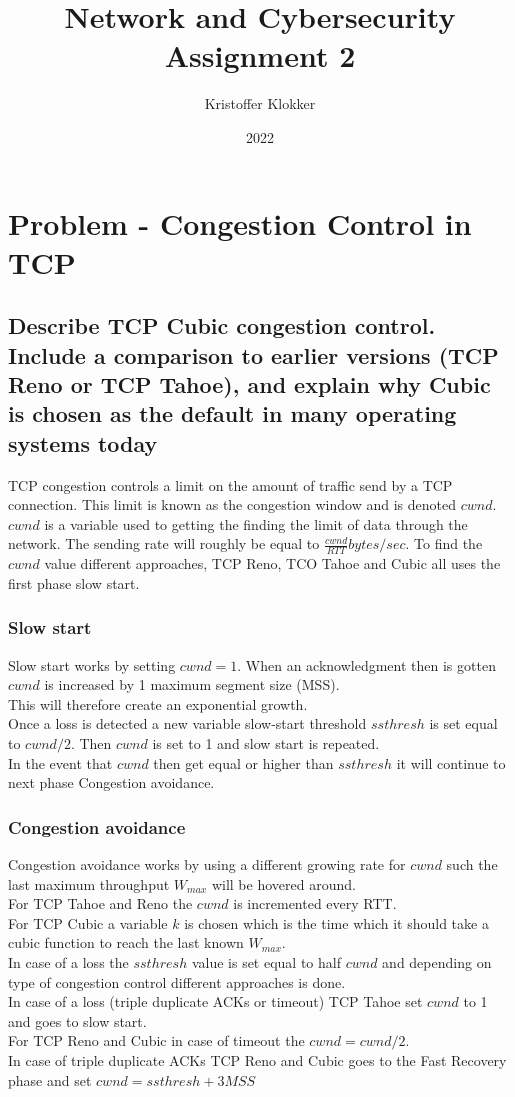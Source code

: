 \documentclass[12pt, a4paper]{article}
\title{Network and Cybersecurity\\ Assignment 2}
\date{2022}
\author{Kristoffer Klokker}
\begin{document}
	\maketitle
	\clearpage
	\tableofcontents
	\clearpage
	\section{Problem - Congestion Control in TCP}
		\subsection{Describe TCP Cubic congestion control. Include a comparison to earlier versions (TCP Reno or TCP Tahoe), and explain why Cubic is chosen as the default in many operating systems today}
			TCP congestion controls a limit on the amount of traffic send by a TCP connection. This limit is known as the congestion window and is denoted $cwnd$.\\
			$cwnd$ is a variable used to getting the finding the limit of data through the network. The sending rate will roughly be equal to $\frac{cwnd}{RTT}bytes/sec$.
			To find the $cwnd$ value different approaches, TCP Reno, TCO Tahoe and Cubic all uses the first phase slow start.
			\subsubsection{Slow start}
				Slow start works by setting $cwnd=1$. When an acknowledgment then is gotten $cwnd$ is increased by 1 maximum segment size (MSS).\\
				This will therefore create an exponential growth.\\
				Once a loss is detected a new variable slow-start threshold $ssthresh$ is set equal to $cwnd/2$. Then $cwnd$ is set to 1 and slow start is repeated.\\
				In the event that $cwnd$ then get equal or higher than $ssthresh$ it will continue to next phase Congestion avoidance.\\
			\subsubsection{Congestion avoidance}
				Congestion avoidance works by using a different growing rate for $cwnd$ such the last maximum throughput $W_{max}$ will be hovered around.\\ 
				For TCP Tahoe and Reno the $cwnd$ is incremented every RTT.\\
				For TCP Cubic a variable $k$ is chosen which is the time which it should take a cubic function to reach the last known $W_{max}$.\\
				In case of a loss the $ssthresh$ value is set equal to half $cwnd$ and depending on type of congestion control different approaches is done.\\
				In case of a loss (triple duplicate ACKs or timeout) TCP Tahoe set $cwnd$ to 1 and goes to slow start.\\
				For TCP Reno and Cubic in case of timeout the $cwnd=cwnd/2$.\\
				In case of triple duplicate ACKs TCP Reno and Cubic goes to the Fast Recovery phase and set $cwnd=ssthresh+3MSS$\\
\end{document}
